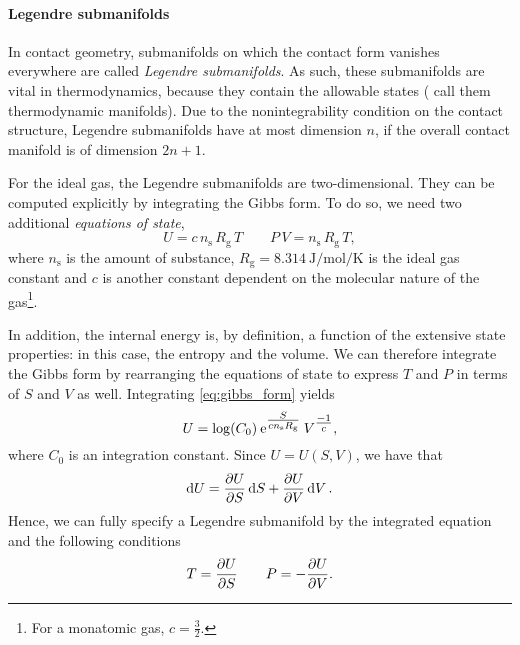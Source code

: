 \paragraph{Legendre submanifolds} In contact geometry, submanifolds on which the contact form vanishes everywhere are called \emph{Legendre submanifolds}. As such, these submanifolds are vital in thermodynamics, because they contain the allowable states (\citet{Balian2001} call them thermodynamic manifolds). Due to the nonintegrability condition on the contact structure, Legendre submanifolds have at most dimension \(n\), if the overall contact manifold is of dimension \(2n + 1\).

For the ideal gas, the Legendre submanifolds are two-dimensional. They can be computed explicitly by integrating the Gibbs form. To do so, we need two additional \emph{equations of state}, 
\begin{equation}
    U = c\, n_\text{s}\, R_\text{g}\, T \qquad P \, V = n_\text{s} \, R_\text{g} \, T,
\end{equation}
where \(n_\text{s}\) is the amount of substance, \(R_\text{g} = \SI{8.314}{\joule \per \mole \per \kelvin}\) is the ideal gas constant and \(c\) is another constant dependent on the molecular nature of the gas\footnote{For a monatomic gas, \(c = \tfrac{3}{2}\).}. 

In addition, the internal energy is, by definition, a function of the extensive state properties: in this case, the entropy and the volume. We can therefore integrate the Gibbs form by rearranging the equations of state to express \(T\) and \(P\) in terms of \(S\) and \(V\) as well. Integrating \cref{eq:gibbs_form} yields
\begin{equation}
     U = \log(C_0) \: \mathrm{e}^{\tfrac{S}{cn_\text{s}R_\text{g}}} \: V^{\tfrac{-1}{c}},
\end{equation}
where \(C_0\) is an integration constant. Since \( U = U(S, V)\), we have that
\begin{equation}
     \dd{U} = \pdv{U}{S}\dd{S} + \pdv{U}{V}\dd{V}.
\end{equation}
Hence, we can fully specify a Legendre submanifold by the integrated equation and the following conditions
\begin{equation}
     T = \pdv{U}{S} \qquad P = -\pdv{U}{V}.
\end{equation}

